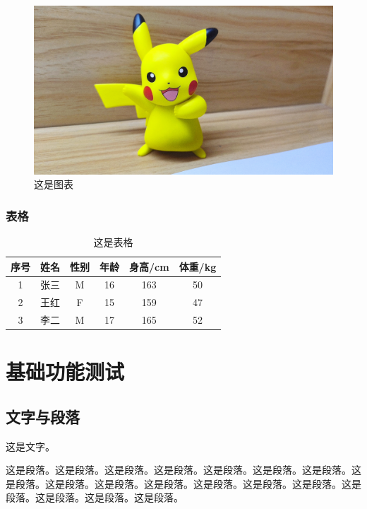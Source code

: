 \begin{ujnbody}
    \begin{figure}[htbp]
        \centering
        \includegraphics[scale=0.1, ]{figures/pikachu.jpg}
        \caption{这是图表}
    \end{figure}

    \subsubsection{表格}

    \begin{table}[!htbp]
        \centering
        \begin{tabular}{cccccc}
            \toprule
            序号 & 姓名 & 性别 & 年龄 & 身高/cm & 体重/kg \\
            \midrule
            1 & 张三 & M & 16 & 163 & 50 \\
            2 & 王红 & F & 15 & 159 & 47 \\
            3 & 李二 & M & 17 & 165 & 52 \\
            \bottomrule
        \end{tabular}
        \caption{这是表格}
    \end{table}

    \section{基础功能测试}
    \subsection{文字与段落}
    这是文字。

    这是段落。这是段落。这是段落。这是段落。这是段落。这是段落。这是段落。这是段落。这是段落。这是段落。这是段落。这是段落。这是段落。这是段落。这是段落。这是段落。这是段落。这是段落。

\end{ujnbody}
